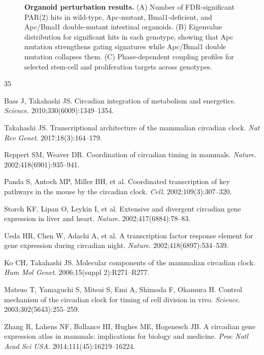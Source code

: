 \documentclass[11pt,letterpaper]{article}
\begin{document}
\begin{figure}[H]
\caption{\textbf{Organoid perturbation results.} (A) Number of FDR-significant PAR(2) hits in wild-type, Apc-mutant, Bmal1-deficient, and Apc/Bmal1 double-mutant intestinal organoids. (B) Eigenvalue distribution for significant hits in each genotype, showing that Apc mutation strengthens gating signatures while Apc/Bmal1 double mutation collapses them. (C) Phase-dependent coupling profiles for selected stem-cell and proliferation targets across genotypes.}
\label{fig:organoid}
\end{figure}


\begin{thebibliography}{35}

Bass J, Takahashi JS.
Circadian integration of metabolism and energetics.
\textit{Science}. 2010;330(6009):1349--1354.

Takahashi JS.
Transcriptional architecture of the mammalian circadian clock.
\textit{Nat Rev Genet}. 2017;18(3):164--179.

Reppert SM, Weaver DR.
Coordination of circadian timing in mammals.
\textit{Nature}. 2002;418(6901):935--941.

Panda S, Antoch MP, Miller BH, et al.
Coordinated transcription of key pathways in the mouse by the circadian clock.
\textit{Cell}. 2002;109(3):307--320.

Storch KF, Lipan O, Leykin I, et al.
Extensive and divergent circadian gene expression in liver and heart.
\textit{Nature}. 2002;417(6884):78--83.

Ueda HR, Chen W, Adachi A, et al.
A transcription factor response element for gene expression during circadian night.
\textit{Nature}. 2002;418(6897):534--539.

Ko CH, Takahashi JS.
Molecular components of the mammalian circadian clock.
\textit{Hum Mol Genet}. 2006;15(suppl 2):R271--R277.

Matsuo T, Yamaguchi S, Mitsui S, Emi A, Shimoda F, Okamura H.
Control mechanism of the circadian clock for timing of cell division in vivo.
\textit{Science}. 2003;302(5643):255--259.

Zhang R, Lahens NF, Ballance HI, Hughes ME, Hogenesch JB.
A circadian gene expression atlas in mammals: implications for biology and medicine.
\textit{Proc Natl Acad Sci USA}. 2014;111(45):16219--16224.


\end{thebibliography}
\end{document}
